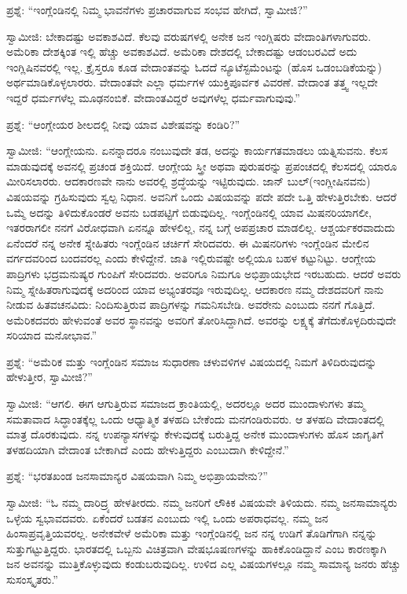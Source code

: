 ಪ್ರಶ್ನೆ: “ಇಂಗ್ಲೆಂಡಿನಲ್ಲಿ ನಿಮ್ಮ ಭಾವನೆಗಳು ಪ್ರಚಾರವಾಗುವ ಸಂಭವ ಹೇಗಿದೆ, ಸ್ವಾಮೀಜಿ?”

ಸ್ವಾಮೀಜಿ: ಬೇಕಾದಷ್ಟು ಅವಕಾಶವಿದೆ. ಕೆಲವು ವರುಷಗಳಲ್ಲಿ ಅನೇಕ ಜನ ಇಂಗ್ಲಿಷರು ವೇದಾಂತಿಗಳಾಗುವರು. ಅಮೆರಿಕಾ ದೇಶಕ್ಕಿಂತ ಇಲ್ಲಿ ಹೆಚ್ಚು ಅವಕಾಶವಿದೆ. ಅಮೆರಿಕಾ ದೇಶದಲ್ಲಿ ಬೇಕಾದಷ್ಟು ಆಡಂಬರವಿದೆ ಅದು ಇಂಗ್ಲಿಷಿನವರಲ್ಲಿ ಇಲ್ಲ. ಕ್ರೈಸ್ತರೂ ಕೂಡ ವೇದಾಂತವನ್ನು ಓದದೆ ನ್ಯೂಟೆಸ್ಟಮೆಂಟನ್ನು (ಹೊಸ ಒಡಂಬಡಿಕೆಯನ್ನು) ಅರ್ಥಮಾಡಿಕೊಳ್ಳಲಾರರು. ವೇದಾಂತವೇ ಎಲ್ಲಾ ಧರ್ಮಗಳ ಯುಕ್ತಿಪೂರ್ವಕ ವಿವರಣೆ. ವೇದಾಂತ ತತ್ತ್ವ ಇಲ್ಲದೇ ಇದ್ದರೆ ಧರ್ಮಗಳೆಲ್ಲ ಮೂಢನಂಬಿಕೆ. ವೇದಾಂತವಿದ್ದರೆ ಅವುಗಳೆಲ್ಲ ಧರ್ಮವಾಗುವುವು.”

ಪ್ರಶ್ನೆ: “ಆಂಗ್ಲೇಯರ ಶೀಲದಲ್ಲಿ ನೀವು ಯಾವ ವಿಶೇಷವನ್ನು ಕಂಡಿರಿ?”

ಸ್ವಾಮೀಜಿ: “ಆಂಗ್ಲೇಯನು. ಏನನ್ನಾದರೂ ನಂಬುವುದೇ ತಡ, ಅದನ್ನು ಕಾರ್ಯಗತಮಾಡಲು ಯತ್ನಿಸುವನು. ಕೆಲಸ ಮಾಡುವುದಕ್ಕೆ ಅವನಲ್ಲಿ ಪ್ರಚಂಡ ಶಕ್ತಿಯಿದೆ. ಆಂಗ್ಲೇಯ ಸ್ತ್ರೀ ಅಥವಾ ಪುರುಷರನ್ನು ಪ್ರಪಂಚದಲ್ಲಿ ಕೆಲಸದಲ್ಲಿ ಯಾರೂ ಮೀರಿಸಲಾರರು. ಆದಕಾರಣವೇ ನಾನು ಅವರಲ್ಲಿ ಶ್ರದ್ಧೆಯನ್ನು ಇಟ್ಟಿರುವುದು. ಜಾನ್​ ಬುಲ್​ (ಇಂಗ್ಲೀಷಿನವನು) ವಿಷಯವನ್ನು ಗ್ರಹಿಸುವುದು ಸ್ವಲ್ಪ ನಿಧಾನ. ಅವನಿಗೆ ಒಂದು ವಿಷಯವನ್ನು ಪದೇ ಪದೇ ಒತ್ತಿ ಹೇಳುತ್ತಿರಬೇಕು. ಆದರೆ ಒಮ್ಮೆ ಅದನ್ನು ತಿಳಿದುಕೊಂಡರೆ ಅವನು ಬಡಪಟ್ಟಿಗೆ ಬಿಡುವುದಿಲ್ಲ. ಇಂಗ್ಲೆಂಡಿನಲ್ಲಿ ಯಾವ ಮಿಷನರಿಯಾಗಲೀ, ಇತರರಾಗಲೀ ನನಗೆ ವಿರೋಧವಾಗಿ ಏನನ್ನೂ ಹೇಳಲಿಲ್ಲ, ನನ್ನ ಬಗ್ಗೆ ಅಪಪ್ರಚಾರ ಮಾಡಲಿಲ್ಲ. ಆಶ್ಚರ್ಯಕರವಾದುದು ಏನೆಂದರೆ ನನ್ನ ಅನೇಕ ಸ್ನೇಹಿತರು ಇಂಗ್ಲೆಂಡಿನ ಚರ್ಚಿಗೆ ಸೇರಿದವರು. ಈ ಮಿಷನರಿಗಳು ಇಂಗ್ಲೆಂಡಿನ ಮೇಲಿನ ವರ್ಗದವರಿಂದ ಬಂದವರಲ್ಲ ಎಂದು ಕೇಳಿದ್ದೇನೆ. ಜಾತಿ ಇಲ್ಲಿರುವಷ್ಟೇ ಅಲ್ಲಿಯೂ ಬಹಳ ಕಟ್ಟುನಿಟ್ಟು. ಆಂಗ್ಲೇಯ ಪಾದ್ರಿಗಳು ಭದ್ರಮನುಷ್ಯರ ಗುಂಪಿಗೆ ಸೇರಿದವರು. ಅವರಿಗೂ ನಿಮಗೂ ಅಭಿಪ್ರಾಯಭೇದ ಇರಬಹುದು. ಆದರೆ ಅವರು ನಿಮ್ಮ ಸ್ನೇಹಿತರಾಗುವುದಕ್ಕೆ ಅದರಿಂದ ಯಾವ ಅಭ್ಯಂತರವೂ ಇರುವುದಿಲ್ಲ. ಆದಕಾರಣ ನಮ್ಮ ದೇಶದವರಿಗೆ ನಾನು ನೀಡುವ ಹಿತವಚನವಿದು: ನಿಂದಿಸುತ್ತಿರುವ ಪಾದ್ರಿಗಳನ್ನು ಗಮನಿಸಬೇಡಿ. ಅವರೇನು ಎಂಬುದು ನನಗೆ ಗೊತ್ತಿದೆ. ಅಮೆರಿಕದವರು ಹೇಳುವಂತೆ ಅವರ ಸ್ಥಾನವನ್ನು ಅವರಿಗೆ ತೋರಿಸಿದ್ದಾಗಿದೆ. ಅವರನ್ನು ಲಕ್ಷ್ಯಕ್ಕೆ ತೆಗೆದುಕೊಳ್ಳದಿರುವುದೇ ಸರಿಯಾದ ಮನೋಭಾವ.”

ಪ್ರಶ್ನೆ: “ಅಮೆರಿಕ ಮತ್ತು ಇಂಗ್ಲೆಂಡಿನ ಸಮಾಜ ಸುಧಾರಣಾ ಚಳುವಳಿಗಳ ವಿಷಯದಲ್ಲಿ ನಿಮಗೆ ತಿಳಿದಿರುವುದನ್ನು ಹೇಳುತ್ತೀರ, ಸ್ವಾಮೀಜಿ?”

ಸ್ವಾಮೀಜಿ: “ಆಗಲಿ. ಈಗ ಆಗುತ್ತಿರುವ ಸಮಾಜದ ಕ್ರಾಂತಿಯಲ್ಲಿ, ಅದರಲ್ಲೂ ಅದರ ಮುಂದಾಳುಗಳು ತಮ್ಮ ಸಮತಾವಾದ ಸಿದ್ಧಾಂತಕ್ಕೆಲ್ಲ ಒಂದು ಆಧ್ಯಾತ್ಮಿಕ ತಳಹದಿ ಬೇಕೆಂದು ಮನಗಂಡಿರುವರು. ಆ ತಳಹದಿ ವೇದಾಂತದಲ್ಲಿ ಮಾತ್ರ ದೊರಕುವುದು. ನನ್ನ ಉಪನ್ಯಾಸಗಳನ್ನು ಕೇಳುವುದಕ್ಕೆ ಬರುತ್ತಿದ್ದ ಅನೇಕ ಮುಂದಾಳುಗಳು ಹೊಸ ಜಾಗೃತಿಗೆ ತಳಹದಿಯಾಗಿ ವೇದಾಂತ ಬೇಕಾಗಿದೆ ಎಂದು ಹೇಳುತ್ತಿದ್ದರು ಎಂಬುದಾಗಿ ಕೇಳಿದ್ದೇನೆ.”

ಪ್ರಶ್ನೆ: “ಭರತಖಂಡ ಜನಸಾಮಾನ್ಯರ ವಿಷಯವಾಗಿ ನಿಮ್ಮ ಅಭಿಪ್ರಾಯವೇನು?”

ಸ್ವಾಮೀಜಿ: “ಓ ನಮ್ಮ ದಾರಿದ್ರ್ಯ ಹೇಳತೀರದು. ನಮ್ಮ ಜನರಿಗೆ ಲೌಕಿಕ ವಿಷಯವೇ ತಿಳಿಯದು. ನಮ್ಮ ಜನಸಾಮಾನ್ಯರು ಒಳ್ಳೆಯ ಸ್ವಭಾವದವರು. ಏಕೆಂದರೆ ಬಡತನ ಎಂಬುದು ಇಲ್ಲಿ ಒಂದು ಅಪರಾಧವಲ್ಲ. ನಮ್ಮ ಜನ ಹಿಂಸಾಪ್ರವೃತ್ತಿಯವರಲ್ಲ. ಅನೇಕವೇಳೆ ಅಮೆರಿಕಾ ಮತ್ತು ಇಂಗ್ಲೆಂಡಿನಲ್ಲಿ ಜನ ನನ್ನ ಉಡಿಗೆ ತೊಡಿಗೆಗಾಗಿ ನನ್ನನ್ನು ಸುತ್ತುಗಟ್ಟುತ್ತಿದ್ದರು. ಭಾರತದಲ್ಲಿ ಒಬ್ಬನು ವಿಚಿತ್ರವಾಗಿ ವೇಷಭೂಷಣಗಳನ್ನು ಹಾಕಿಕೊಂಡಿದ್ದಾನೆ ಎಂಬ ಕಾರಣಕ್ಕಾಗಿ ಜನ ಅವನನ್ನು ಮುತ್ತಿಕೊಳ್ಳುವುದು ಕಂಡುಬರುವುದಿಲ್ಲ. ಉಳಿದ ಎಲ್ಲ ವಿಷಯಗಳಲ್ಲೂ ನಮ್ಮ ಸಾಮಾನ್ಯ ಜನರು ಹೆಚ್ಚು ಸುಸಂಸ್ಕೃತರು.”

